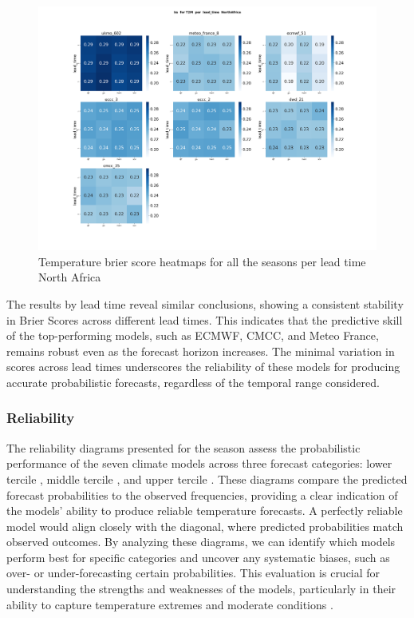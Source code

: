 \begin{figure}[H]
    \centering
    \includegraphics[width=1\linewidth]{plots/prob/bs/bs_T2M_lead_time_NorthAfrica.png}
    \caption{Temperature brier score heatmaps for all the seasons per lead time North Africa}
\end{figure}
The results by lead time reveal similar conclusions, showing a consistent stability in Brier Scores across different lead times. This indicates that the predictive skill of the top-performing models, such as ECMWF, CMCC, and Meteo France, remains robust even as the forecast horizon increases. The minimal variation in scores across lead times underscores the reliability of these models for producing accurate probabilistic forecasts, regardless of the temporal range considered.
\subsubsection{Reliability}
The reliability diagrams presented for the season assess the probabilistic performance of the seven climate models across three forecast categories: lower tercile , middle tercile , and upper tercile . These diagrams compare the predicted forecast probabilities to the observed frequencies, providing a clear indication of the models' ability to produce reliable temperature forecasts. A perfectly reliable model would align closely with the diagonal, where predicted probabilities match observed outcomes. By analyzing these diagrams, we can identify which models perform best for specific categories and uncover any systematic biases, such as over- or under-forecasting certain probabilities. This evaluation is crucial for understanding the strengths and weaknesses of the models, particularly in their ability to capture temperature extremes and moderate conditions .


